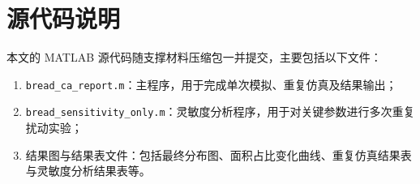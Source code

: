 \documentclass[12pt,a4paper]{ctexart}
\begin{document}
\section{源代码说明}

本文的 MATLAB 源代码随支撑材料压缩包一并提交，主要包括以下文件：
\begin{enumerate}
    \item \texttt{bread\_ca\_report.m}：主程序，用于完成单次模拟、重复仿真及结果输出；
    \item \texttt{bread\_sensitivity\_only.m}：灵敏度分析程序，用于对关键参数进行多次重复扰动实验；
    \item 结果图与结果表文件：包括最终分布图、面积占比变化曲线、重复仿真结果表与灵敏度分析结果表等。
\end{enumerate}
\end{document}
